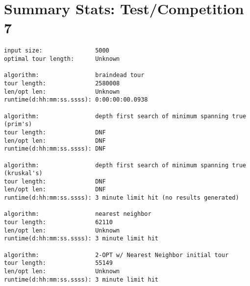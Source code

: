 \documentclass[12pt]{article}
\begin{document}
\newpage
\section*{Summary Stats: Test/Competition 7}
\begin{verbatim}
input size:               5000
optimal tour length:      Unknown

algorithm:                braindead tour
tour length:              2580008
len/opt len:              Unknown
runtime(d:hh:mm:ss.ssss): 0:00:00:00.0938

algorithm:                depth first search of minimum spanning true (prim's) 
tour length:              DNF
len/opt len:              DNF
runtime(d:hh:mm:ss.ssss): DNF

algorithm:                depth first search of minimum spanning true (kruskal's) 
tour length:              DNF
len/opt len:              DNF
runtime(d:hh:mm:ss.ssss): 3 minute limit hit (no results generated)

algorithm:                nearest neighbor 
tour length:              62110
len/opt len:              Unknown
runtime(d:hh:mm:ss.ssss): 3 minute limit hit

algorithm:                2-OPT w/ Nearest Neighbor initial tour
tour length:              55149
len/opt len:              Unknown
runtime(d:hh:mm:ss.ssss): 3 minute limit hit
\end{verbatim}

\newpage
\printbibliography
\end{document}
